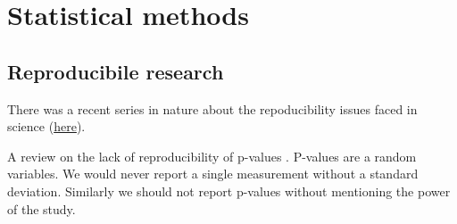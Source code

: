 \section{Statistical methods}

\subsection{Reproducibile research}

    There was a recent series in nature about the repoducibility issues faced
    in science
    (\href{http://www.nature.com/news/reproducibility-1.17552}{here}).

    A review on the lack of reproducibility of p-values
    \cite{halsey2015fickle}. P-values are a random variables. We would never
    report a single measurement without a standard deviation. Similarly we
    should not report p-values without mentioning the power of the study.
